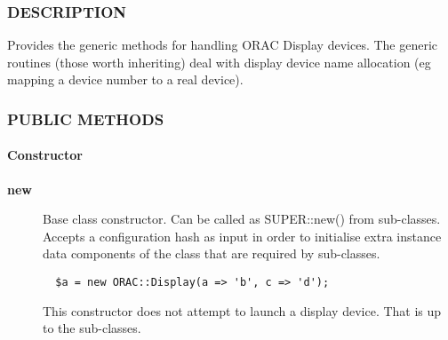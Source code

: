 \subsubsection*{DESCRIPTION\label{ORAC::Display::Base_DESCRIPTION}}


Provides the generic methods for handling ORAC Display devices.
The generic routines (those worth inheriting) deal with display
device name allocation (eg mapping a device number to a real device).

\subsubsection*{PUBLIC METHODS\label{ORAC::Display::Base_PUBLIC_METHODS}}
\paragraph*{Constructor\label{ORAC::Display::Base_Constructor}}
\begin{description}

\item[\textbf{new}] \mbox{}

Base class constructor. Can be called as SUPER::new() from
sub-classes. Accepts a configuration hash as input in order to
initialise extra instance data components of the class that are
required by sub-classes.

\begin{verbatim}
  $a = new ORAC::Display(a => 'b', c => 'd');
\end{verbatim}


This constructor does not attempt to launch a display device.
That is up to the sub-classes.

\end{description}
